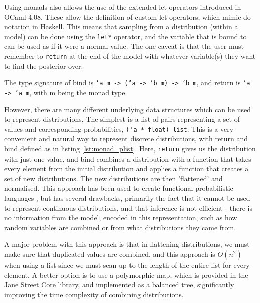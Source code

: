 Using monads also allows the use of the extended let operators introduced in OCaml 4.08. These allow the definition of custom let operators, which mimic do-notation in Haskell. This means that sampling from a distribution (within a model) can be done using the \texttt{let*} operator, and the variable that is bound to can be used as if it were a normal value. The one caveat is that the user must remember to \texttt{return} at the end of the model with whatever variable(s) they want to find the posterior over.

The type signature of bind is \texttt{'a m -> ('a -> 'b m) -> 'b m}, and return is \texttt{'a -> 'a m}, with m being the monad type.


However, there are many different underlying data structures which can be used to represent distributions. The simplest is a list of pairs representing a set of values and corresponding probabilities, \texttt{('a * float) list}. This is a very convenient and natural way to represent discrete distributions, with return and bind defined as in listing \ref{lst:monad_plist}. Here, \texttt{return} gives us the distribution with just one value, and bind combines a distribution with a function that takes every element from the initial distribution and applies a function that creates a set of new distributions. The new distributions are then 'flattened' and normalised. This approach has been used to create functional probabilistic languages \cite{erwig}, but has several drawbacks, primarily the fact that it cannot be used to represent continuous distributions, and that inference is not efficient - there is no information from the model, encoded in this representation, such as how random variables are combined or from what distributions they came from.



A major problem with this approach is that in flattening distributions, we must make sure that duplicated values are combined, and this approach is $O(n^2)$ when using a list since we must scan up to the length of the entire list for every element. A better option is to use a polymorphic map, which is provided in the Jane Street Core library, and implemented as a balanced tree, significantly improving the time complexity of combining distributions.

